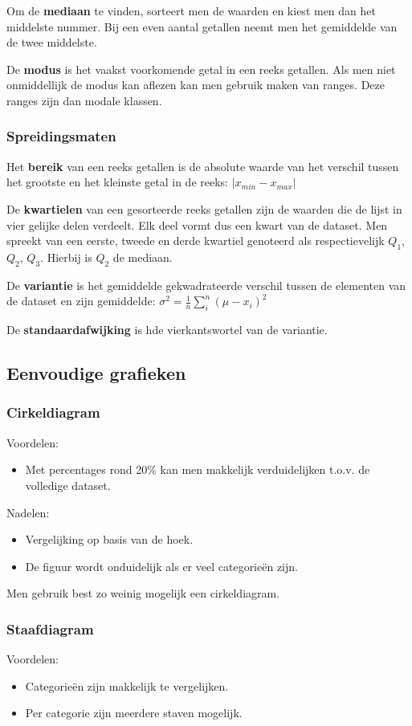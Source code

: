 \documentclass[a4paper,12pt]{article}
\begin{document}
Om de \textbf{mediaan} te vinden, sorteert men de waarden en kiest men dan het middelste nummer.
Bij een even aantal getallen neemt men het gemiddelde van de twee middelste.

De \textbf{modus} is het vaakst voorkomende getal in een reeks getallen.
Als men niet onmiddellijk de modus kan aflezen kan men gebruik maken van ranges. Deze ranges zijn dan modale klassen.

\subsubsection{Spreidingsmaten}
Het \textbf{bereik} van een reeks getallen is de absolute waarde van het verschil tussen het grootste en het kleinste getal in de reeks: $|x_{min} - x_{max}|$

De \textbf{kwartielen} van een gesorteerde reeks getallen zijn de waarden die de lijst in vier gelijke delen verdeelt.
Elk deel vormt dus een kwart van de dataset.
Men spreekt van een eerste, tweede en derde kwartiel genoteerd als respectievelijk $Q_1$, $Q_2$, $Q_3$. Hierbij is $Q_2$ de mediaan.

De \textbf{variantie} is het gemiddelde gekwadrateerde verschil tussen de elementen van de dataset en zijn gemiddelde:
$\sigma^2 = \frac{1}{n}\sum^n_i (\mu-x_i)^2$

De \textbf{standaardafwijking} is hde vierkantswortel van de variantie.

\subsection{Eenvoudige grafieken}
\subsubsection{Cirkeldiagram}
Voordelen:
\begin{itemize}
\item Met percentages rond 20\% kan men makkelijk verduidelijken t.o.v. de volledige dataset.
\end{itemize}
Nadelen:
\begin{itemize}
\item Vergelijking op basis van de hoek.
\item De figuur wordt onduidelijk als er veel categorieën zijn.
\end{itemize}
Men gebruik best zo weinig mogelijk een cirkeldiagram.

\subsubsection{Staafdiagram}
Voordelen:
\begin{itemize}
\item Categorieën zijn makkelijk te vergelijken.
\item Per categorie zijn meerdere staven mogelijk.
\end{itemize}
\end{document}
